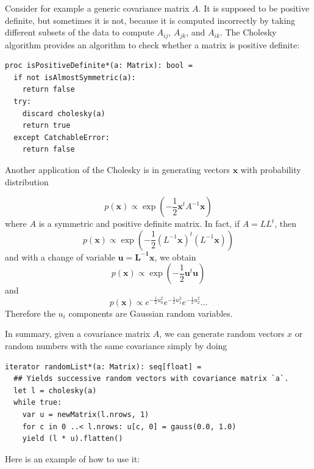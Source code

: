 \documentclass[justified, sixbynine]{tufte-book}
\def\ft{\small\tt}
\theoremstyle{plain}%
\newtheorem * {corollary}{Corollary}
\theoremstyle{definition}
\theoremstyle{remark}
\newtheorem * {remark}{Remark}
\newtheorem * {note}{Note}
\begin{document}
\begin{fullwidth}
Consider for example a generic covariance matrix $A$. It is supposed to be positive definite, but sometimes it is not, because it is computed incorrectly by taking different subsets of the data to compute $A_{ij}$, $A_{jk}$, and $A_{ik}$. The Cholesky algorithm provides an algorithm to check whether a matrix is positive definite:

\begin{lstlisting}[caption={in file: {\ft nlib.nim}}]
proc isPositiveDefinite*(a: Matrix): bool =
  if not isAlmostSymmetric(a):
    return false
  try:
    discard cholesky(a)
    return true
  except CatchableError:
    return false
\end{lstlisting}

Another application of the Cholesky is in generating vectors $\mathbf{x}$ with probability distribution

\begin{equation}
p(\mathbf{x}) \propto \exp\left(-\frac12 \mathbf{x}^t A^{-1} \mathbf{x}\right)
\end{equation}
where $A$ is a symmetric and positive definite matrix. In fact, if $A=LL^t$, then
\begin{equation}
p(\mathbf{x}) \propto \exp\left(-\frac12 (L^{-1}\mathbf{x})^t (L^{-1}\mathbf{x})\right)
\end{equation}
and with a change of variable $\mathbf{u}=\mathbf{L^{-1}x}$, we obtain
\begin{equation}
p(\mathbf{x}) \propto \exp\left(-\frac12 \mathbf{u}^t \mathbf{u}\right)
\end{equation}
and
\begin{equation}
p(\mathbf{x}) \propto e^{-\frac12 u_0^2}e^{-\frac12 u_1^2}e^{-\frac12 u_2^2}...
\end{equation}
Therefore the $u_i$ components are Gaussian random variables.

In summary, given a covariance matrix $A$, we can generate random vectors $x$ or random numbers with the same covariance simply by doing

\begin{lstlisting}[caption={in file: {\ft nlib.nim}}]
iterator randomList*(a: Matrix): seq[float] =
  ## Yields successive random vectors with covariance matrix `a`.
  let l = cholesky(a)
  while true:
    var u = newMatrix(l.nrows, 1)
    for c in 0 ..< l.nrows: u[c, 0] = gauss(0.0, 1.0)
    yield (l * u).flatten()
\end{lstlisting}

Here is an example of how to use it:


\end{fullwidth}
\end{document}
